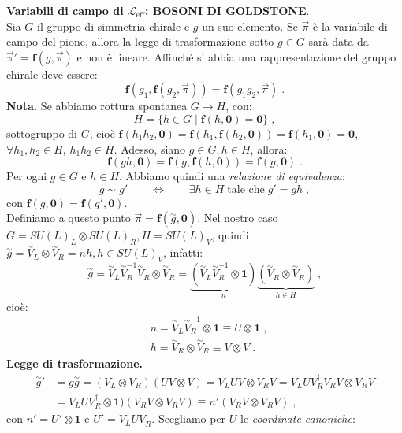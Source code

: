 \documentclass[12pt,a4paper]{article}
\theoremstyle{definition}
\newcommand{\lag}{\mathcal{L}}
\newcommand{\adj}[1]{#1^{\dagger}}
\numberwithin{equation}{section}
\begin{document}
\textbf{Variabili di campo di $\lag_{\mathrm{eff}}$: BOSONI DI GOLDSTONE}. \\
Sia $G$ il gruppo di simmetria chirale e $g$ un suo elemento. Se $\vec{\pi}$ è la variabile di campo del pione, allora la legge di trasformazione sotto $g\in G$ sarà data da $\vec{\pi}'=\mathbf{f}(g,\vec{\pi})$ e non è lineare. Affinché si abbia una rappresentazione del gruppo chirale deve essere:
$$
\mathbf{f}(g_1,\mathbf{f}(g_2,\vec{\pi}))=\mathbf{f}(g_1g_2,\vec{\pi})\;.
$$
\textbf{Nota.} Se abbiamo rottura spontanea $G\to H$, con:
$$
H=\{h\in G\;|\;\mathbf{f}(h,\mathbf{0})=\mathbf{0}\}\;,
$$
sottogruppo di $G$, cioè $\mathbf{f}(h_1h_2,\mathbf{0})=\mathbf{f}(h_1,\mathbf{f}(h_2,\mathbf{0}))=\mathbf{f}(h_1,\mathbf{0})=\mathbf{0}$, $\forall h_1,h_2\in H$, $h_1h_2\in H$. Adesso, siano $g\in G,h\in H$, allora:
$$
\mathbf{f}(gh,\mathbf{0})=\mathbf{f}(g,\mathbf{f}(h,\mathbf{0}))=\mathbf{f}(g,\mathbf{0})\;.
$$
Per ogni $g\in G$ e $h\in H$. Abbiamo quindi una \emph{relazione di equivalenza}:
\begin{equation}
g\sim g' \qquad \Longleftrightarrow\qquad \exists h\in H\;\mbox{tale che}\; g'=gh\;,
\end{equation}
con $\mathbf{f}(g,\mathbf{0})=\mathbf{f}(g',\mathbf{0})$. \\
Definiamo a questo punto $\vec{\pi}=\mathbf{f}(\stackrel{\sim}{g},\mathbf{0})$. Nel nostro caso $G=SU(L)_L\otimes SU(L)_R,H=SU(L)_V$, quindi $\stackrel{\sim}{g}=\stackrel{\sim}{V}_L\otimes\stackrel{\sim}{V}_R=nh, h\in SU(L)_V$, infatti:
$$
\stackrel{\sim}{g}=\stackrel{\sim}{V}_L\stackrel{\sim}{V}_R^{-1}\stackrel{\sim}{V}_R\otimes \stackrel{\sim}{V}_R=\underbrace{(\stackrel{\sim}{V}_L\stackrel{\sim}{V}_R^{-1}\otimes \mathbf{1})}_{n}\underbrace{(\stackrel{\sim}{V}_R\otimes\stackrel{\sim}{V}_R)}_{h\in H}\;,
$$
cioè:
\begin{align*}
&n=\stackrel{\sim}{V}_L\stackrel{\sim}{V}_R^{-1}\otimes\mathbf{1}\equiv U\otimes \mathbf{1}\;, \\
&h=\stackrel{\sim}{V}_R\otimes\stackrel{\sim}{V}_R\equiv V\otimes V\;.
\end{align*}
\textbf{Legge di trasformazione.}
\begin{align*}
\stackrel{\sim}{g}'&=g\stackrel{\sim}{g}=(V_L\otimes V_R)(UV\otimes V)=V_LUV\otimes V_RV=V_LU\adj{V}_RV_RV\otimes V_RV \\
&=V_LU\adj{V}_R\otimes\mathbf{1})(V_RV\otimes V_RV)\equiv n'(V_RV\otimes V_RV)\;,
\end{align*}
con $n'=U'\otimes \mathbf{1}$ e $U'=V_LU\adj{V}_R$. Scegliamo per $U$ le \emph{coordinate canoniche}:
\end{document}
